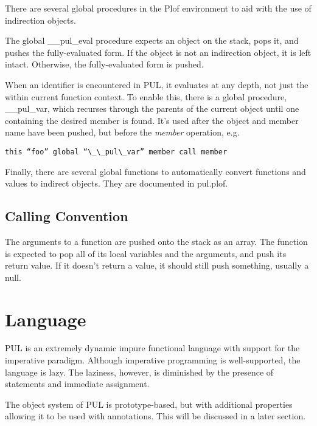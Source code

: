 There are several global procedures in the Plof environment to aid with the use of indirection objects.

The global \_\_pul\_eval procedure expects an object on the stack, pops it, and pushes the fully-evaluated form. If the object is not an indirection object, it is left intact. Otherwise, the fully-evaluated form is pushed.

When an identifier is encountered in PUL, it evaluates at any depth, not just the within current function context. To enable this, there is a global procedure, \_\_pul\_var, which recurses through the parents of the current object until one containing the desired member is found. It's used after the object and member name have been pushed, but before the \textit{member} operation, e.g.

\begin{verbatim}
this “foo” global “\_\_pul\_var” member call member
\end{verbatim}

Finally, there are several global functions to automatically convert functions and values to indirect objects. They are documented in pul.plof.



\subsection{Calling Convention}

The arguments to a function are pushed onto the stack as an array. The function is expected to pop all of its local variables and the arguments, and push its return value. If it doesn't return a value, it should still push something, usually a null.



\section{Language}

PUL is an extremely dynamic impure functional language with support for the imperative paradigm. Although imperative programming is well-supported, the language is lazy. The laziness, however, is diminished by the presence of statements and immediate assignment.

The object system of PUL is prototype-based, but with additional properties allowing it to be used with annotations. This will be discussed in a later section.



